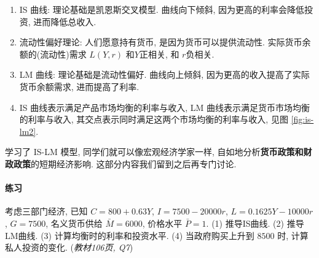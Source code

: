 \documentclass[11pt]{ctexart}
\begin{document}
\begin{enumerate}
\item
  IS 曲线: 理论基础是凯恩斯交叉模型. 曲线向下倾斜, 因为更高的利率会降低投资, 进而降低总收入.
\item
  流动性偏好理论: 人们愿意持有货币, 是因为货币可以提供流动性. 实际货币余额的(流动性)需求 $L(Y,r)$ 和$Y$正相关, 和 $r$负相关.
\item
  LM 曲线: 理论基础是流动性偏好. 曲线向上倾斜, 因为更高的收入提高了实际货币余额需求, 进而提高了利率.
\item
  IS 曲线表示满足产品市场均衡的利率与收入, LM
  曲线表示满足货币市场均衡的利率与收入, 其交点表示同时满足这两个市场均衡的利率与收入, 见图 \ref{fig:is-lm2}. 
\end{enumerate}

学习了 IS-LM 模型, 同学们就可以像宏观经济学家一样,
自如地分析\textbf{货币政策和财政政策}的短期经济影响.
这部分内容我们留到之后再专门讨论.

%

\paragraph{练习}
考虑三部门经济, 已知 $C=800+0.63Y$, $I = 7500-20000r$,
$L=0.1625Y-10000r$, $G=7500$, 名义货币供给 $\bar{M} = 6000$, 价格水平 $\bar{P} = 1$.
(1) 推导IS曲线.
(2) 推导LM曲线.
(3) 计算均衡时的利率和投资水平.
(4) 当政府购买上升到 $8500$ 时, 计算私人投资的变化.
\hfill{(\textit{教材106页, Q7})}
\end{document}
